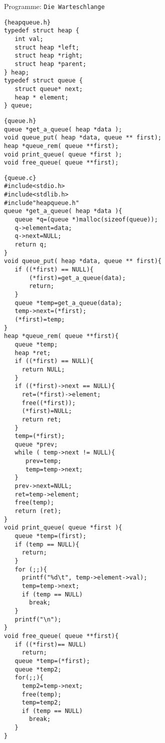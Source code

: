 \begin{myexampleprogram}{ Programme: \texttt{Die Warteschlange}}	
\begin{lstlisting}{heapqueue.h}
typedef struct heap {
   int val;
   struct heap *left;
   struct heap *right;
   struct heap *parent;
} heap;
typedef struct queue {
   struct queue* next;
   heap * element;
} queue;
\end{lstlisting}
\begin{lstlisting}{queue.h}
queue *get_a_queue( heap *data );
void queue_put( heap *data, queue ** first);
heap *queue_rem( queue **first);
void print_queue( queue *first );
void free_queue( queue **first);
\end{lstlisting}

\begin{lstlisting}{queue.c}
#include<stdio.h>
#include<stdlib.h>
#include"heapqueue.h"
queue *get_a_queue( heap *data ){
   queue *q=(queue *)malloc(sizeof(queue));
   q->element=data;
   q->next=NULL;
   return q;
}
void queue_put( heap *data, queue ** first){
   if ((*first) == NULL){
       (*first)=get_a_queue(data);
       return;
   }
   queue *temp=get_a_queue(data);
   temp->next=(*first);
   (*first)=temp;
}
heap *queue_rem( queue **first){
   queue *temp;
   heap *ret;
   if ((*first) == NULL){
     return NULL;
   }
   if ((*first)->next == NULL){
     ret=(*first)->element;
     free((*first));
     (*first)=NULL;
     return ret;
   }
   temp=(*first);
   queue *prev;
   while ( temp->next != NULL){
      prev=temp;
      temp=temp->next;
   }
   prev->next=NULL;
   ret=temp->element;
   free(temp);
   return (ret);
}
void print_queue( queue *first ){
   queue *temp=(first);
   if (temp == NULL){
     return;
   }
   for (;;){
     printf("%d\t", temp->element->val);
     temp=temp->next;
     if (temp == NULL)
       break;
   }
   printf("\n");
}
void free_queue( queue **first){
   if ((*first)== NULL)
     return;
   queue *temp=(*first);
   queue *temp2;
   for(;;){
     temp2=temp->next;
     free(temp);
     temp=temp2;
     if (temp == NULL)
       break;
   }
}
\end{lstlisting}
\end{myexampleprogram}
